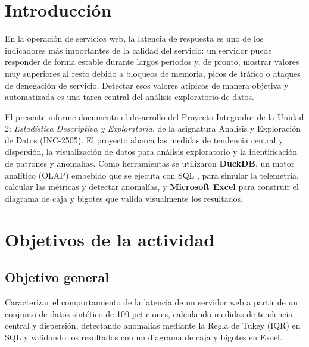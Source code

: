 \documentclass[12pt,letterpaper]{article}
\begin{document}
\newpage
{} %

\tableofcontents %
\newpage

\listoffigures %
\newpage
 
 
\section{Introducción}
En la operación de servicios web, la latencia de respuesta es uno de los indicadores más importantes de la calidad del servicio: un servidor puede responder de forma estable durante largos periodos y, de pronto, mostrar valores muy superiores al resto debido a bloqueos de memoria, picos de tráfico o ataques de denegación de servicio. Detectar esos valores atípicos de manera objetiva y automatizada es una tarea central del análisis exploratorio de datos. \cite{tukey-1977}
 
El presente informe documenta el desarrollo del Proyecto Integrador de la Unidad 2: \textit{Estadística Descriptiva y Exploratoria}, de la asignatura Análisis y Exploración de Datos (INC-2505). El proyecto abarca las medidas de tendencia central y dispersión, la visualización de datos para análisis exploratorio y la identificación de patrones y anomalías. Como herramientas se utilizaron \textbf{DuckDB}, un motor analítico (OLAP) embebido que se ejecuta con SQL \cite{raasveldt-2019}, para simular la telemetría, calcular las métricas y detectar anomalías, y \textbf{Microsoft Excel} para construir el diagrama de caja y bigotes que valida visualmente los resultados.
 
\section{Objetivos de la actividad}
\subsection{Objetivo general}
Caracterizar el comportamiento de la latencia de un servidor web a partir de un conjunto de datos sintético de 100 peticiones, calculando medidas de tendencia central y dispersión, detectando anomalías mediante la Regla de Tukey (IQR) en SQL y validando los resultados con un diagrama de caja y bigotes en Excel.
 
\end{document}
